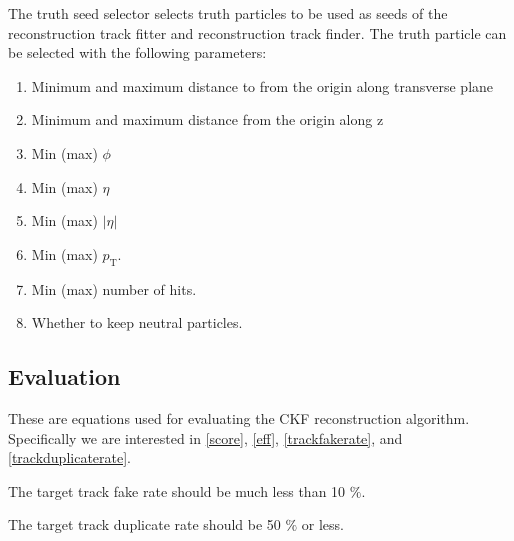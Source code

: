 \documentclass{article}
\newcommand{\pt}[0]{p_\textrm{T}}
\begin{document}
The truth seed selector selects truth particles to be used as seeds of the reconstruction track fitter and reconstruction track finder. The truth particle can be selected with the following parameters:

\begin{enumerate}
\item Minimum and maximum distance to from the origin along transverse plane
\item Minimum and maximum distance from the origin along z
\item Min (max) $\phi$
\item Min (max) $\eta$
\item Min (max) $|\eta|$
\item Min (max) $\pt$.
\item Min (max) number of hits. 
\item Whether to keep neutral particles.
\end{enumerate}

\subsection{Evaluation}

These are equations used for evaluating the CKF reconstruction algorithm. Specifically we are interested in \eqref{score}, \eqref{eff}, \eqref{trackfakerate}, and \eqref{trackduplicaterate}.






The target track fake rate should be much less than 10 $\%$.


The target track duplicate rate should be 50 $\%$ or less.

\end{document}

